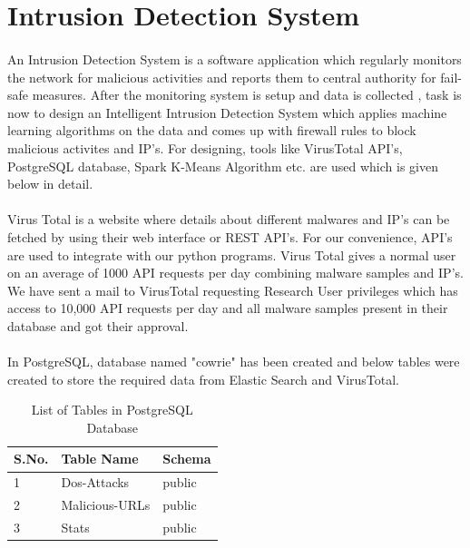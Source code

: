 \documentclass{report}
\begin{document}
\section{Intrusion Detection System}
\paragraph{}
An Intrusion Detection System is a software application which regularly monitors the network for malicious activities and reports them to central authority for fail-safe measures. After the monitoring system is setup and data is collected , task is now to design an Intelligent Intrusion Detection System which applies machine learning algorithms on the data and comes up with firewall rules to block malicious activites and IP's. For designing, tools like VirusTotal API's, PostgreSQL database, Spark K-Means Algorithm etc. are used which is given below in detail.

\paragraph{}
Virus Total is a website where details about different malwares and IP's can be fetched by using their web interface or REST API's. For our convenience, API's are used to integrate with our python programs. Virus Total gives a normal user on an average of 1000 API requests per day combining malware samples and IP's. We have sent a mail to VirusTotal requesting Research User  privileges which has access to 10,000 API requests per day and all malware samples present in their database and got their approval.

\paragraph{}
In PostgreSQL, database named "cowrie" has been created and below tables were created to store the required data from Elastic Search and VirusTotal.

\begin{table}


\begin{tabular}{ |p{2cm}|p{5cm}|p{5cm}|  }
 \hline
 \textbf{S.No.} & \textbf{Table Name} & \textbf{Schema}\\
 \hline
 \hline
 1 & Dos-Attacks & public \\
 \hline
2 & Malicious-URLs & public \\
\hline
3 & Stats & public \\
\hline
\end{tabular}
 \caption{List of Tables in PostgreSQL Database}
\end{table}
\end{document}
